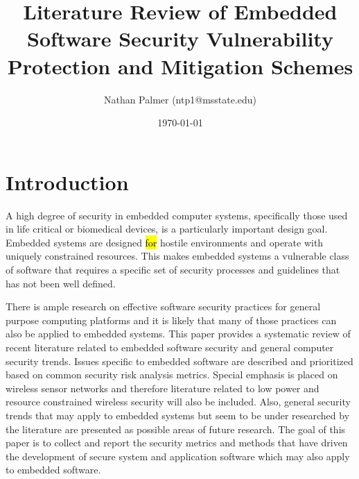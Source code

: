 \documentclass[final,conference,10pt]{IEEEtran}
\author{Nathan Palmer (ntp1@msstate.edu)}
\date{\today}
\title{Literature Review of Embedded Software Security Vulnerability Protection and Mitigation Schemes}
\begin{document}
\maketitle


\section{Introduction} 
A high degree of security in embedded computer systems, specifically those used in life critical or biomedical devices, is a particularly important design goal.  Embedded systems are designed \hl{for} hostile environments and operate with uniquely constrained resources. This makes embedded systems a vulnerable class of software that requires a specific set of security processes and guidelines that has not been well defined.   

There is ample research on effective software security practices for general purpose computing platforms and it is likely that many of those practices can also be applied to embedded systems. This paper provides a systematic review of recent literature related to embedded software security and general computer security trends. Issues specific to embedded software are described and prioritized based on common security risk analysis metrics.  Special emphasis is placed on wireless sensor networks and therefore literature related to low power and resource constrained wireless security will also be included.  Also, general security trends that may apply to embedded systems but seem to be under researched by the literature are presented as possible areas of future research.  The goal of this paper is to collect and report the security metrics and methods that have driven the development of secure system and application software which may also apply to embedded software.
\end{document}

